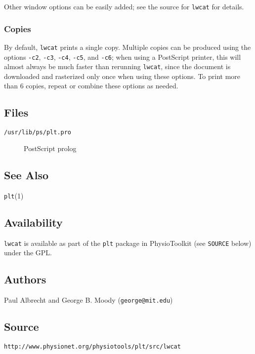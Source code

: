 Other
window options can be easily added;  see the source for \texttt{lwcat} for details.
 
\subsubsection*{Copies}

By default, \texttt{lwcat} prints a single copy.  Multiple copies can be produced
using the options \texttt{-c2}, \texttt{-c3}, \texttt{-c4}, \texttt{-c5}, and \texttt{-c6};  when using a PostScript printer,
this will almost always be much faster than rerunning \texttt{lwcat}, since the
document is downloaded and rasterized only once when using these options.
 To print more than 6 copies, repeat or combine these options as needed.

\subsection*{Files}
\begin{description}
\item [\texttt{/usr/lib/ps/plt.pro} ] PostScript prolog 
\end{description}

\subsection*{See Also}


\textsf{\texttt{plt}(1)} 
\subsection*{Availability}
\texttt{lwcat}
is available as part of the \texttt{plt} package in PhysioToolkit (see \texttt{SOURCE} below)
under the GPL. 
\subsection*{Authors}
Paul Albrecht and George B. Moody (\texttt{george@mit.edu}) 
\subsection*{Source}
\texttt{http://www.physionet.org/physiotools/plt/src/lwcat}

\
